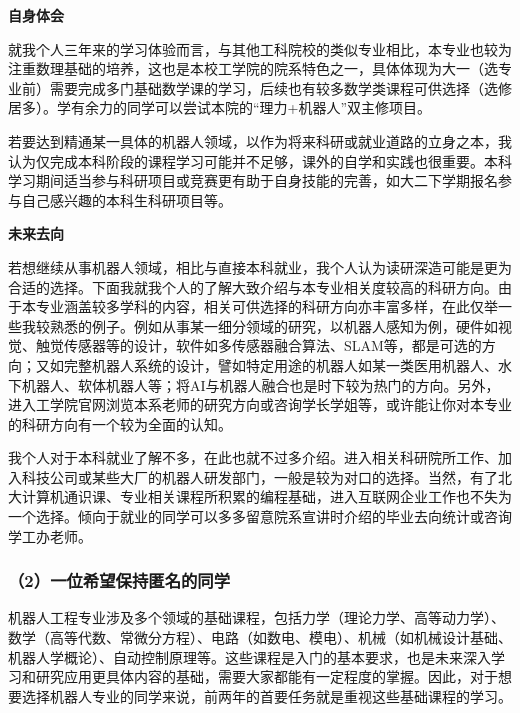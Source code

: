 \documentclass[11pt,oneside]{book}
\begin{document}
\textbf{自身体会}

就我个人三年来的学习体验而言，与其他工科院校的类似专业相比，本专业也较为注重数理基础的培养，这也是本校工学院的院系特色之一，具体体现为大一（选专业前）需要完成多门基础数学课的学习，后续也有较多数学类课程可供选择（选修居多）。学有余力的同学可以尝试本院的“理力+机器人”双主修项目。

\vspace{10pt}

若要达到精通某一具体的机器人领域，以作为将来科研或就业道路的立身之本，我认为仅完成本科阶段的课程学习可能并不足够，课外的自学和实践也很重要。本科学习期间适当参与科研项目或竞赛更有助于自身技能的完善，如大二下学期报名参与自己感兴趣的本科生科研项目等。

\vspace{10pt}

\textbf{未来去向}

若想继续从事机器人领域，相比与直接本科就业，我个人认为读研深造可能是更为合适的选择。下面我就我个人的了解大致介绍与本专业相关度较高的科研方向。由于本专业涵盖较多学科的内容，相关可供选择的科研方向亦丰富多样，在此仅举一些我较熟悉的例子。例如从事某一细分领域的研究，以机器人感知为例，硬件如视觉、触觉传感器等的设计，软件如多传感器融合算法、SLAM等，都是可选的方向；又如完整机器人系统的设计，譬如特定用途的机器人如某一类医用机器人、水下机器人、软体机器人等；将AI与机器人融合也是时下较为热门的方向。另外，进入工学院官网浏览本系老师的研究方向或咨询学长学姐等，或许能让你对本专业的科研方向有一个较为全面的认知。

\vspace{10pt}

我个人对于本科就业了解不多，在此也就不过多介绍。进入相关科研院所工作、加入科技公司或某些大厂的机器人研发部门，一般是较为对口的选择。当然，有了北大计算机通识课、专业相关课程所积累的编程基础，进入互联网企业工作也不失为一个选择。倾向于就业的同学可以多多留意院系宣讲时介绍的毕业去向统计或咨询学工办老师。

\subsubsection{（2）一位希望保持匿名的同学}
机器人工程专业涉及多个领域的基础课程，包括力学（理论力学、高等动力学）、数学（高等代数、常微分方程）、电路（如数电、模电）、机械（如机械设计基础、机器人学概论）、自动控制原理等。这些课程是入门的基本要求，也是未来深入学习和研究应用更具体内容的基础，需要大家都能有一定程度的掌握。因此，对于想要选择机器人专业的同学来说，前两年的首要任务就是重视这些基础课程的学习。
\end{document}
